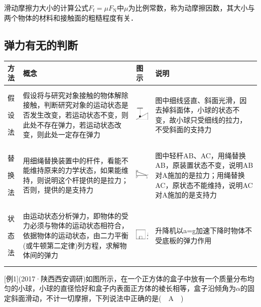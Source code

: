 滑动摩擦力大小的计算公式$F_{\mathrm{f}}=\mu F_{\mathrm{N}}$中$\mu$为比例常数，称为动摩擦因数，其大小与两个物体的材料和接触面的粗糙程度有关．

\newpage
\subsection{弹力有无的判断}

\begin{longtable}[]{@{}m{1cm}m{6.1cm}m{2cm}m{4cm}@{}}
	\toprule
	方法& 概念& 图示&说明 \tabularnewline
	\midrule
	假
	
	设
	
	法& 假设将与研究对象接触的物体解除接触，判断研究对象的运动状态是否发生改变，若运动状态不变，则此处不存在弹力，若运动状态改变，则此处一定存在弹力  &
	\includegraphics[height=0.55208in]{media/image40.png}&
	图中细线竖直、斜面光滑，因去掉斜面体，小球的状态不变，故小球只受细线的拉力，不受斜面的支持力\tabularnewline
	
	替
	
	换
	
	法 & 用细绳替换装置中的杆件，看能不能维持原来的力学状态，如果能维持，则说明这个杆提供的是拉力；否则，提供的是支持力&
	\includegraphics[height=0.48333in]{media/image41.png}&
	图中轻杆AB、AC，用绳替换AB，原装置状态不变，说明AB对A施加的是拉力；用绳替换AC，原状态不能维持，说明AC对A施加的是支持力\strut
	\tabularnewline
	状
	
	态
	
	法 & 由运动状态分析弹力，即物体的受力必须与物体的运动状态相符合，依据物体的运动状态，由二力平衡(或牛顿第二定律)列方程，求解物体间的弹力 &
	\includegraphics[height=0.42708in]{media/image42.png}&
	升降机以a=g加速下降时物体不受底板的弹力作用\tabularnewline
	\bottomrule
	\end{longtable}
{[}例1{]}(2017·陕西西安调研)如图所示，在一个正方体的盒子中放有一个质量分布均匀的小球，小球的直径恰好和盒子内表面正方体的棱长相等，盒子沿倾角为$\alpha$的固定斜面滑动，不计一切摩擦，下列说法中正确的是(　A　)

